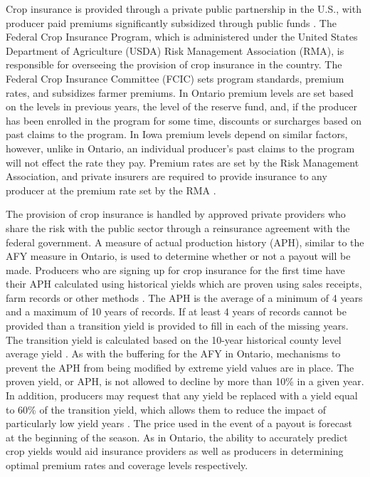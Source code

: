 Crop insurance is provided through a private public partnership in the U.S., with producer paid premiums significantly subsidized through public funds \citep{NCIS}. The Federal Crop Insurance Program, which is administered under the United States Department of Agriculture (USDA) Risk Management Association (RMA), is responsible for overseeing the provision of crop insurance in the country.  The Federal Crop Insurance Committee (FCIC) sets program standards, premium rates, and subsidizes farmer premiums. In Ontario premium levels are set based on the levels in previous years, the level of the reserve fund, and, if the producer has been enrolled in the program for some time, discounts or surcharges based on past claims to the program. In Iowa premium levels depend on similar factors, however, unlike in Ontario, an individual producer's past claims to the program will not effect the rate they pay.  Premium rates are set by the Risk Management Association, and private insurers are required to provide insurance to any producer at the premium rate set by the RMA \citep{NCIS}. 

The provision of crop insurance is handled by approved private providers who share the risk with the public sector through a reinsurance agreement with the federal government. A measure of actual production history (APH), similar to the AFY measure in Ontario, is used to determine whether or not a payout will be made. Producers who are signing up for crop insurance for the first time have their APH calculated using historical yields which are proven using sales receipts, farm records or other methods \citep{ISU}. The APH is the average of a minimum of 4 years and a maximum of 10 years of records. If at least 4 years of records cannot be provided than a transition yield is provided to fill in each of the missing years. The transition yield is calculated based on the 10-year historical county level average yield \citep{ISU}. As with the buffering for the AFY in Ontario, mechanisms to prevent the APH from being modified by extreme yield values are in place. The proven yield, or APH, is not allowed to decline by more than 10\% in a given year. In addition, producers may request that any yield be replaced with a yield equal to 60\% of the transition yield, which allows them to reduce the impact of particularly low yield years \citep{ISU}. The price used in the event of a payout is forecast at the beginning of the season.  As in Ontario, the ability to accurately predict crop yields would aid insurance providers as well as producers in determining optimal premium rates and coverage levels respectively.


